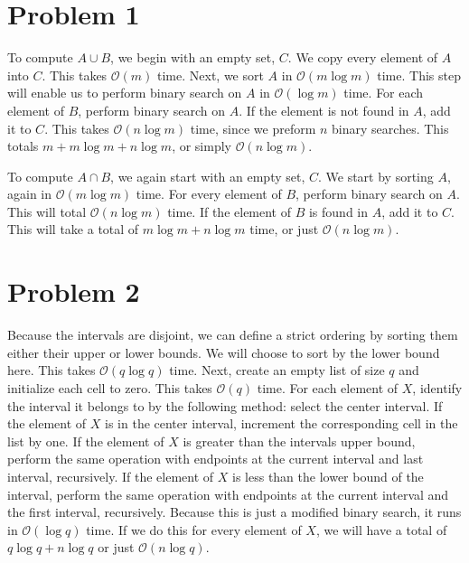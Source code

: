\documentclass{article}
\newenvironment{problem}[1]{
  \nobreak\section*{Problem #1}
}{}
\newcommand*{\bigO}[1]{\ensuremath{\mathcal{O}\left(#1\right)}}
\begin{document}
  \begin{problem}{1}
    To compute $A \cup B$, we begin with an empty set, $C$.  We copy
    every element of $A$ into $C$.  This takes $\bigO{m}$ time.
    Next, we sort $A$ in $\bigO{m\log{m}}$ time.  This step will
    enable us to perform binary search on $A$ in $\bigO{\log{m}}$
    time.  For each element of $B$, perform binary search on $A$.
    If the element is not found in $A$, add it to $C$.  This takes
    $\bigO{n\log{m}}$ time, since we preform $n$ binary searches.
    This totals $m + m\log{m} + n\log{m}$, or simply \bigO{n\log{m}}.

    To compute $A \cap B$, we again start with an empty set, $C$.  We
    start by sorting $A$, again in \bigO{m\log{m}} time.  For every
    element of $B$, perform binary search on $A$.  This will total
    \bigO{n\log{m}} time.  If the element of $B$ is found in $A$, add
    it to $C$.  This will take a total of $m\log{m} + n\log{m}$ time,
    or just \bigO{n\log{m}}.
  \end{problem}

  \begin{problem}{2}
    Because the intervals are disjoint, we can define a strict
    ordering by sorting them either their upper or lower bounds.  We
    will choose to sort by the lower bound here.  This takes
    \bigO{q\log{q}} time.  Next, create an empty list of size $q$ and
    initialize each cell to zero.  This takes \bigO{q} time.  For
    each element of $X$, identify the interval it belongs to by the
    following method: select the center interval.  If the element of
    $X$ is in the center interval, increment the corresponding cell
    in the list by one.  If the element of $X$ is greater than the
    intervals upper bound, perform the same operation with endpoints
    at the current interval and last interval, recursively.  If the
    element of $X$ is less than the lower bound of the interval,
    perform the same operation with endpoints at the current interval
    and the first interval, recursively.  Because this is just a
    modified binary search, it runs in \bigO{\log{q}} time.  If we
    do this for every element of $X$, we will have a total of
    $q\log{q} + n\log{q}$ or just \bigO{n\log{q}}.
  \end{problem}
\end{document}
